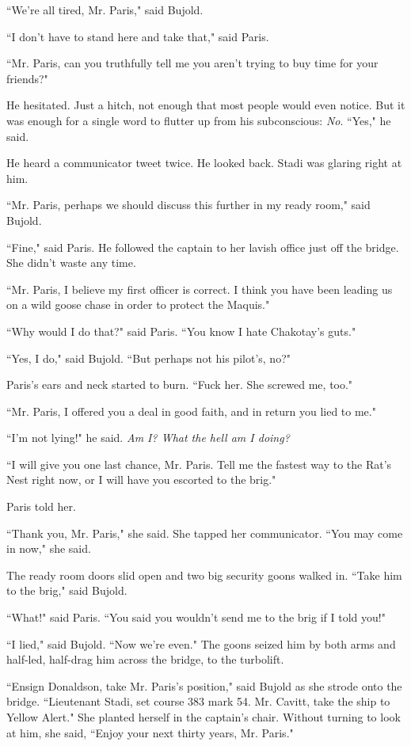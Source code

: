 \documentclass[twoside,letterpaper,12pt]{memoir}
\begin{document}
``We're all tired, Mr. Paris," said Bujold.

``I don't have to stand here and take that," said Paris.

``Mr. Paris, can you truthfully tell me you aren't trying to buy time for your friends?"

He hesitated. Just a hitch, not enough that most people would even notice. But it was enough for a single word to flutter up from his subconscious: \textit{No}. ``Yes," he said.

He heard a communicator tweet twice. He looked back. Stadi was glaring right at him.

``Mr. Paris, perhaps we should discuss this further in my ready room," said Bujold.

``Fine," said Paris. He followed the captain to her lavish office just off the bridge. She didn't waste any time.

``Mr. Paris, I believe my first officer is correct. I think you have been leading us on a wild goose chase in order to protect the Maquis."

``Why would I do that?" said Paris. ``You know I hate Chakotay's guts."

``Yes, I do," said Bujold. ``But perhaps not his pilot's, no?"

Paris's ears and neck started to burn. ``Fuck her. She screwed me, too."

``Mr. Paris, I offered you a deal in good faith, and in return you lied to me."

``I'm not lying!" he said. \textit{Am I? What the hell am I doing?}

``I will give you one last chance, Mr. Paris. Tell me the fastest way to the Rat's Nest right now, or I will have you escorted to the brig."

Paris told her.

``Thank you, Mr. Paris," she said. She tapped her communicator. ``You may come in now," she said.

The ready room doors slid open and two big security goons walked in. ``Take him to the brig," said Bujold.

``What!" said Paris. ``You said you wouldn't send me to the brig if I told you!"

``I lied," said Bujold. ``Now we're even." The goons seized him by both arms and half-led, half-drag him across the bridge, to the turbolift.

``Ensign Donaldson, take Mr. Paris's position," said Bujold as she strode onto the bridge. ``Lieutenant Stadi, set course 383 mark 54. Mr. Cavitt, take the ship to Yellow Alert." She planted herself in the captain's chair. Without turning to look at him, she said, ``Enjoy your next thirty years, Mr. Paris."
\end{document}

